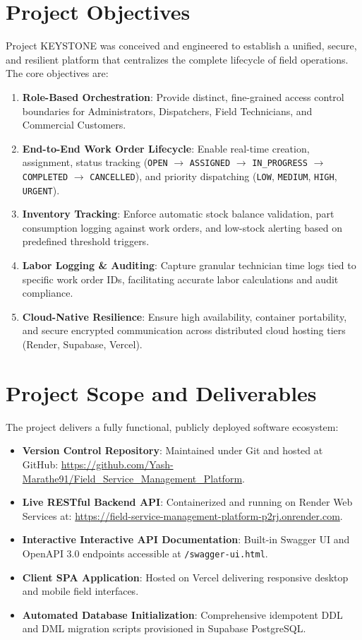 \documentclass[12pt,a4paper,oneside]{report}
\begin{document}
\section{Project Objectives}
Project KEYSTONE was conceived and engineered to establish a unified, secure, and resilient platform that centralizes the complete lifecycle of field operations. The core objectives are:
\begin{enumerate}
    \item \textbf{Role-Based Orchestration}: Provide distinct, fine-grained access control boundaries for Administrators, Dispatchers, Field Technicians, and Commercial Customers.
    \item \textbf{End-to-End Work Order Lifecycle}: Enable real-time creation, assignment, status tracking (\texttt{OPEN} $\rightarrow$ \texttt{ASSIGNED} $\rightarrow$ \texttt{IN\_PROGRESS} $\rightarrow$ \texttt{COMPLETED} $\rightarrow$ \texttt{CANCELLED}), and priority dispatching (\texttt{LOW}, \texttt{MEDIUM}, \texttt{HIGH}, \texttt{URGENT}).
    \item \textbf{Inventory Tracking}: Enforce automatic stock balance validation, part consumption logging against work orders, and low-stock alerting based on predefined threshold triggers.
    \item \textbf{Labor Logging \& Auditing}: Capture granular technician time logs tied to specific work order IDs, facilitating accurate labor calculations and audit compliance.
    \item \textbf{Cloud-Native Resilience}: Ensure high availability, container portability, and secure encrypted communication across distributed cloud hosting tiers (Render, Supabase, Vercel).
\end{enumerate}

\section{Project Scope and Deliverables}
The project delivers a fully functional, publicly deployed software ecosystem:
\begin{itemize}
    \item \textbf{Version Control Repository}: Maintained under Git and hosted at GitHub: \url{https://github.com/Yash-Marathe91/Field_Service_Management_Platform}.
    \item \textbf{Live RESTful Backend API}: Containerized and running on Render Web Services at: \url{https://field-service-management-platform-p2rj.onrender.com}.
    \item \textbf{Interactive Interactive API Documentation}: Built-in Swagger UI and OpenAPI 3.0 endpoints accessible at \texttt{/swagger-ui.html}.
    \item \textbf{Client SPA Application}: Hosted on Vercel delivering responsive desktop and mobile field interfaces.
    \item \textbf{Automated Database Initialization}: Comprehensive idempotent DDL and DML migration scripts provisioned in Supabase PostgreSQL.
\end{itemize}
\end{document}

